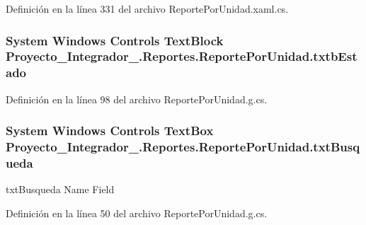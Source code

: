 Definición en la línea 331 del archivo Reporte\-Por\-Unidad.\-xaml.\-cs.

\hypertarget{class_proyecto___integrador__3_1_1_reportes_1_1_reporte_por_unidad_ab7c8420e279514d7fcf295a15f77c9d4}{
\subsubsection[{txtb\-Estado}]{\setlength{\rightskip}{0pt plus 5cm}System Windows Controls Text\-Block Proyecto\-\_\-\-Integrador\-\_.\-Reportes.\-Reporte\-Por\-Unidad.\-txtb\-Estado\hspace{0.3cm}{\ttfamily [package]}}}\label{class_proyecto___integrador__3_1_1_reportes_1_1_reporte_por_unidad_ab7c8420e279514d7fcf295a15f77c9d4}


Definición en la línea 98 del archivo Reporte\-Por\-Unidad.\-g.\-cs.

\hypertarget{class_proyecto___integrador__3_1_1_reportes_1_1_reporte_por_unidad_a0a6db8ee110ce078b4507f464c026fda}{
\subsubsection[{txt\-Busqueda}]{\setlength{\rightskip}{0pt plus 5cm}System Windows Controls Text\-Box Proyecto\-\_\-\-Integrador\-\_.\-Reportes.\-Reporte\-Por\-Unidad.\-txt\-Busqueda}}\label{class_proyecto___integrador__3_1_1_reportes_1_1_reporte_por_unidad_a0a6db8ee110ce078b4507f464c026fda}


txt\-Busqueda Name Field 



Definición en la línea 50 del archivo Reporte\-Por\-Unidad.\-g.\-cs.



